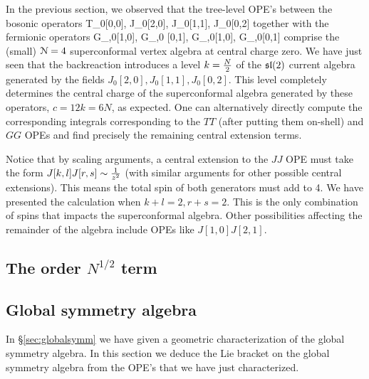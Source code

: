 \documentclass[../main.tex]{subfiles}
\begin{document}
In the previous section, we observed that the tree-level OPE's between the bosonic operators 
\beqn
T_0[0,0], J_0[2,0], J_0[1,1], J_0[0,2]
\eeqn
together with the fermionic operators
\beqn
G_{\alpha,0}[1,0], G_{\alpha,0} [0,1], G_{\gamma,0}[1,0], G_{\gamma,0}[0,1]
\eeqn
comprise the (small) $\mathcal{N}=4$ superconformal vertex algebra at central charge zero.
We have just seen that the backreaction introduces a level $k = {N \over 2}$ of the $\mathfrak{sl}(2)$ current algebra generated by the fields $J_0[2,0], J_0[1,1], J_0[0,2]$.
This level completely determines the central charge of the superconformal algebra generated by these operators, $c = 12 k = 6 N$, as expected. One can alternatively directly compute the corresponding integrals corresponding to the $TT$ (after putting them on-shell) and $GG$ OPEs and find precisely the remaining central extension terms. 


Notice that by scaling arguments, a central extension to the $JJ$ OPE must take the form $J[k, l]J[r, s] \sim {1 \over z^2}$ (with similar arguments for other possible central extensions). This means the total spin of both generators must add to 4. We have presented the calculation when $k + l =2, r + s =2$. This is the only combination of spins that impacts the superconformal algebra. Other possibilities affecting the remainder of the algebra include OPEs like $J[1, 0]J[2, 1]$.




\subsection{The order $N^{1/2}$ term}

\subsection{Global symmetry algebra}

In \S \ref{sec:globalsymm} we have given a geometric characterization of the global symmetry algebra.
In this section we deduce the Lie bracket on the global symmetry algebra from the OPE's that we have just characterized.
\end{document}
